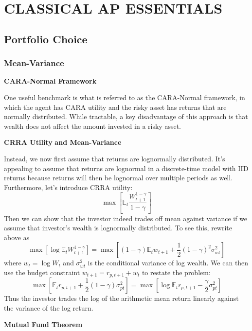 \documentclass[
]{book}
\begin{document}
\hypertarget{part-classical-ap-essentials}{%
\part*{CLASSICAL AP ESSENTIALS}\label{part-classical-ap-essentials}}

\hypertarget{portfolio-choice}{%
\chapter{Portfolio Choice}\label{portfolio-choice}}

\hypertarget{mean-variance}{%
\section{Mean-Variance}\label{mean-variance}}

\textbf{CARA-Normal Framework}

One useful benchmark is what is referred to as the CARA-Normal framework, in which the agent has CARA utility and the risky asset has returns that are normally distributed. While tractable, a key disadvantage of this approach is that wealth does not affect the amount invested in a risky asset.

\textbf{CRRA Utility} \textbf{and Mean-Variance}

Instead, we now first assume that returns are lognormally distributed. It's appealing to assume that returns are lognormal in a discrete-time model with IID returns because returns will then be lognormal over multiple periods as well. Furthermore, let's introduce CRRA utility:
\[
\max \left[\mathbb{E}_t \frac{W_{t+1}^{1-\gamma}}{1-\gamma}\right]
\]
Then we can show that the investor indeed trades off mean against variance if we assume that investor's wealth is lognormally distributed. To see this, rewrite above as
\[
\max[\log\mathbb{E}_tW_{t+1}^{1-\gamma}] = \max\left[(1-\gamma) \mathbb{E}_tw_{t+1} + \frac{1}{2}(1-\gamma)^2 \sigma_{wt}^2\right]
\]
where \(w_t =\log W_t\) and \(\sigma_{wt}^2\) is the conditional variance of log wealth. We can then use the budget constraint \(w_{t+1} = r_{p,t+1}+w_t\) to restate the problem:
\[
\max \left[\mathbb{E}_t r_{p,t+1} + \frac{1}{2} (1-\gamma) \sigma_{pt}^2\right]=\max\left[\log \mathbb{E}_t r_{p,t+1} - \frac{\gamma}{2} \sigma_{pt}^2\right]
\]
Thus the investor trades the log of the arithmetic mean return linearly against the variance of the log return.

\textbf{Mutual Fund Theorem}
\end{document}
